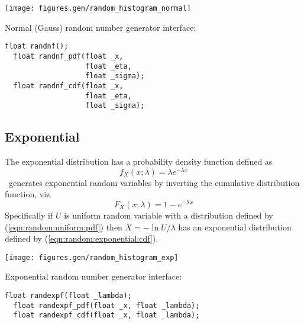 \begin{minipage}{0.5\textwidth}
  \texttt{[image: figures.gen/random\_histogram\_normal]}
\end{minipage}
\begin{minipage}{0.5\textwidth}
  Normal (Gauss) random number generator interface:
  \begin{Verbatim}[fontsize=\small]
  float randnf();
  float randnf_pdf(float _x,
                   float _eta,
                   float _sigma);
  float randnf_cdf(float _x,
                   float _eta,
                   float _sigma);
  \end{Verbatim}
\end{minipage}


\subsection{Exponential}
\label{module:random:exponential}
The exponential distribution has a probability density function
defined as
%
\begin{equation}
\label{eqn:random:exponential:pdf}
    f_X(x;\lambda) = \lambda e^{-\lambda x}
\end{equation}
%
\liquid\ generates exponential random variables by inverting the
cumulative distribution function, viz
%
\begin{equation}
\label{eqn:random:exponential:cdf}
    F_X(x;\lambda) = 1 - e^{-\lambda x}
\end{equation}
%
Specifically if $U$ is uniform random variable with a distribution
defined by (\ref{eqn:random:uniform:pdf}) then
$X = -\ln U / \lambda$
%
has an exponential distribution defined by
(\ref{eqn:random:exponential:cdf}).

\begin{minipage}{0.5\textwidth}
  \texttt{[image: figures.gen/random\_histogram\_exp]}
\end{minipage}
\begin{minipage}{0.5\textwidth}
  Exponential random number generator interface:
  \begin{Verbatim}[fontsize=\small]
  float randexpf(float _lambda);
  float randexpf_pdf(float _x, float _lambda);
  float randexpf_cdf(float _x, float _lambda);
  \end{Verbatim}
\end{minipage}



% 
%
